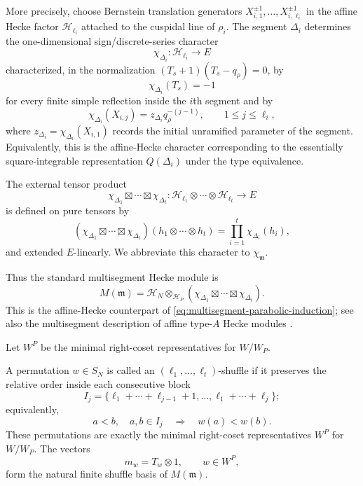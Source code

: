 \documentclass[12pt]{article}
\theoremstyle{definition}
\theoremstyle{remark}
\begin{document}
More precisely, choose Bernstein translation generators
$X_{i,1}^{\pm1},\ldots,X_{i,\ell_i}^{\pm1}$ in the affine Hecke factor
$\mathcal H_{\ell_i}$ attached to the cuspidal line of $\rho_i$.  The
segment $\Delta_i$ determines the one-dimensional sign/discrete-series
character
\begin{equation}\label{eq:segment-Hecke-character-definition}
 \chi_{\Delta_i}:\mathcal H_{\ell_i}\longrightarrow E
\end{equation}
characterized, in the normalization $(T_s+1)(T_s-q_\rho)=0$, by
\[
 \chi_{\Delta_i}(T_s)=-1
\]
for every finite simple reflection inside the $i$th segment and by
\begin{equation}\label{eq:segment-Bernstein-values-general}
 \chi_{\Delta_i}(X_{i,j})
 =z_{\Delta_i}q_\rho^{-(j-1)},
 \qquad 1\leq j\leq\ell_i,
\end{equation}
where $z_{\Delta_i}=\chi_{\Delta_i}(X_{i,1})$ records the initial
unramified parameter of the segment.  Equivalently, this is the affine-Hecke
character corresponding to the essentially square-integrable representation
$Q(\Delta_i)$ under the type equivalence.

The external tensor product
\[
 \chi_{\Delta_1}\boxtimes\cdots\boxtimes\chi_{\Delta_t}
 :\mathcal H_{\ell_1}\otimes\cdots\otimes\mathcal H_{\ell_t}
 \longrightarrow E
\]
is defined on pure tensors by
\begin{equation}\label{eq:external-segment-character}
 (\chi_{\Delta_1}\boxtimes\cdots\boxtimes\chi_{\Delta_t})
 (h_1\otimes\cdots\otimes h_t)
 =\prod_{i=1}^t\chi_{\Delta_i}(h_i),
\end{equation}
and extended $E$-linearly.  We abbreviate this character to
$\chi_{\mathfrak m}$.

Thus the standard multisegment Hecke module is
\begin{equation}\label{eq:multisegment-Hecke-standard-module}
 M(\mathfrak m)
 =
 \mathcal H_N
 \otimes_{\mathcal H_P}
 \left(
 \chi_{\Delta_1}\boxtimes\cdots\boxtimes\chi_{\Delta_t}
 \right).
\end{equation}
This is the affine-Hecke counterpart of
\eqref{eq:multisegment-parabolic-induction}; see also the multisegment
description of affine type-\(A\) Hecke modules \cite{Vazirani2001}.

Let \(W^P\) be the minimal right-coset representatives for \(W/W_P\).

A permutation $w\in S_N$ is called an
$({\ell_1},\ldots,{\ell_t})$-shuffle if it preserves the relative order
inside each consecutive block
\[
 I_j=\{\ell_1+\cdots+\ell_{j-1}+1,\ldots,
       \ell_1+\cdots+\ell_j\};
\]
equivalently,
\[
 a<b,\quad a,b\in I_j
 \quad\Longrightarrow\quad
 w(a)<w(b).
\]
These permutations are exactly the minimal right-coset representatives
$W^P$ for $W/W_P$.  The vectors
\begin{equation}\label{eq:shuffle-basis}
 m_w=T_w\otimes1,
 \qquad
 w\in W^P,
\end{equation}
form the natural finite shuffle basis of \(M(\mathfrak m)\).
\end{document}
